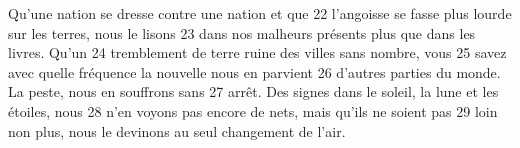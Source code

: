 Qu'une nation se dresse contre une nation et que	 
22	 	l'angoisse se fasse plus lourde sur les terres, nous le lisons	 
23	 	dans nos malheurs présents plus que dans les livres. Qu'un	 
24	 	tremblement de terre ruine des villes sans nombre, vous	 
25	 	savez avec quelle fréquence la nouvelle nous en parvient	 
26	 	d'autres parties du monde. La peste, nous en souffrons sans	 
27	 	arrêt. Des signes dans le soleil, la lune et les étoiles, nous	 
28	 	n'en voyons pas encore de nets, mais qu'ils ne soient pas	 
29	 	loin non plus, nous le devinons au seul changement de l'air.